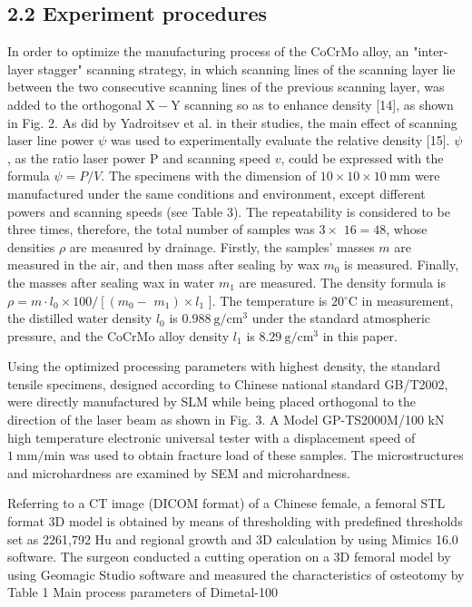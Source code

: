 \documentclass[10pt]{article}
\begin{document}
\subsection*{2.2 Experiment procedures}
In order to optimize the manufacturing process of the CoCrMo alloy, an "inter-layer stagger" scanning strategy, in which scanning lines of the scanning layer lie between the two consecutive scanning lines of the previous scanning layer, was added to the orthogonal $\mathrm{X}-\mathrm{Y}$ scanning so as to enhance density [14], as shown in Fig. 2. As did by Yadroitsev et al. in their studies, the main effect of scanning laser line power $\psi$ was used to experimentally evaluate the relative density [15]. $\psi$, as the ratio laser power $\mathrm{P}$ and scanning speed $v$, could be expressed with the formula $\psi=P / V$. The specimens with the dimension of $10 \times 10 \times 10 \mathrm{~mm}$ were manufactured under the same conditions and environment, except different powers and scanning speeds (see Table 3). The repeatability is considered to be three times, therefore, the total number of samples was $3 \times$ $16=48$, whose densities $\rho$ are measured by drainage. Firstly, the samples' masses $m$ are measured in the air, and then mass after sealing by wax $m_{0}$ is measured. Finally, the masses after sealing wax in water $m_{1}$ are measured. The density formula is $\rho=m \cdot l_{0} \times 100 /\left[\left(m_{0}-\right.\right.$ $\left.m_{1}\right) \times l_{1}$ ]. The temperature is $20{ }^{\circ} \mathrm{C}$ in measurement, the distilled water density $l_{0}$ is $0.988 \mathrm{~g} / \mathrm{cm}^{3}$ under the standard atmospheric pressure, and the CoCrMo alloy density $l_{1}$ is $8.29 \mathrm{~g} / \mathrm{cm}^{3}$ in this paper.

Using the optimized processing parameters with highest density, the standard tensile specimens, designed according to Chinese national standard GB/T2002, were directly manufactured by SLM while being placed orthogonal to the direction of the laser beam as shown in Fig. 3. A Model GP-TS2000M/100 kN high temperature electronic universal tester with a displacement speed of $1 \mathrm{~mm} / \mathrm{min}$ was used to obtain fracture load of these samples. The microstructures and microhardness are examined by SEM and microhardness.

Referring to a CT image (DICOM format) of a Chinese female, a femoral STL format 3D model is obtained by means of thresholding with predefined thresholds set as 2261,792 $\mathrm{Hu}$ and regional growth and 3D calculation by using Mimics 16.0 software. The surgeon conducted a cutting operation on a 3D femoral model by using Geomagic Studio software and measured the characteristics of osteotomy by\\
Table 1 Main process parameters of Dimetal-100
\end{document}
